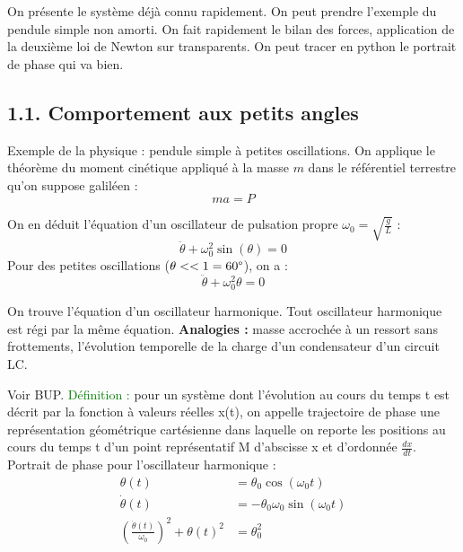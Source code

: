 \documentclass[french, a4paper, 10pt, twocolumn, landscape]{article}
\begin{document}
On présente le système déjà connu rapidement. On peut prendre l'exemple du pendule simple non amorti. On fait rapidement le bilan des forces, application de la deuxième loi de Newton sur transparents. On peut tracer en python le portrait de phase qui va bien. 

\subsection*{1.1. Comportement aux petits  angles}

Exemple de la physique : pendule simple à petites oscillations. On applique le théorème du moment cinétique appliqué à la masse $m$ dans le référentiel terrestre qu'on suppose galiléen :
  \begin{equation}
    ma = P
  \end{equation}
  
  On en déduit l'équation d'un oscillateur de pulsation propre $\omega_0=\sqrt{\frac{g}{L}}$ :
  \begin{equation}
      \ddot{\theta} + \omega_0^2\sin(\theta) = 0
  \end{equation}
  Pour des petites oscillations ($\theta<<1=60\degree$), on a :
  \begin{equation}
      \ddot{\theta} + \omega_0^2\theta = 0
  \end{equation}
  
  On trouve l'équation d'un oscillateur harmonique. Tout oscillateur harmonique est régi par la même équation. \textbf{Analogies :} masse accrochée à un ressort sans frottements, l'évolution temporelle de la charge d'un condensateur d'un circuit LC. 


  Voir BUP. \textcolor{green}{Définition :} pour un système dont l’évolution au cours du temps t est décrit par la fonction à valeurs réelles x(t), on appelle trajectoire de phase une représentation géométrique cartésienne dans laquelle on reporte les positions au cours du temps t d’un point représentatif M d’abscisse x et d’ordonnée $\frac{dx}{dt}$.\\
  Portrait de phase pour l'oscillateur harmonique : 
  \begin{align}
      \theta(t) &= \theta_0\cos(\omega_0t) \\
      \dot{\theta}(t) &= -\theta_0\omega_0\sin(\omega_0t) \\
      \left(\frac{\dot{\theta}(t)}{\omega_0}\right)^2 + \theta(t)^2 &= \theta_0^2
  \end{align}
  
\end{document}
